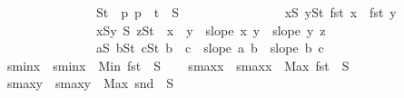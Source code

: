 \begin{isabellebody}
\ \ \ \ \ \ \ \ \ \ \ \ \ \ {\isacharparenleft}{\kern0pt}\ S{}t\ {\isacharequal}{\kern0pt}\ {\isacharparenleft}{\kern0pt}{\isasymlambda}p{\isachardot}{\kern0pt}\ p\ {\isacharplus}{\kern0pt}\ t{\isacharparenright}{\kern0pt}\ {\isacharbackquote}{\kern0pt}\ S{}\ {\isasymand}\isanewline
\ \ \ \ \ \ \ \ \ \ \ \ \ \ \ {\isacharparenleft}{\kern0pt}{\isasymforall}x{\isasymin}S{}{\isachardot}{\kern0pt}\ {\isasymforall}y{\isasymin}S{}t{\isachardot}{\kern0pt}\ fst\ x\ {\isacharless}{\kern0pt}\ fst\ y{\isacharparenright}{\kern0pt}\ {\isasymand}\isanewline
\ \ \ \ \ \ \ \ \ \ \ \ \ \ \ {\isacharparenleft}{\kern0pt}{\isasymforall}x{\isasymin}S{}{\isachardot}{\kern0pt}{\isasymforall}y{\isasymin}\ S{}{\isachardot}{\kern0pt}\ {\isasymforall}z{\isasymin}S{}t{\isachardot}{\kern0pt}\ \ x\ {\isacharless}{\kern0pt}\ y\ {\isasymlongrightarrow}\ slope\ x\ y\ {\isacharless}{\kern0pt}\ slope\ y\ z{\isacharparenright}{\kern0pt}\ {\isasymand}\isanewline
\ \ \ \ \ \ \ \ \ \ \ \ \ \ \ {\isacharparenleft}{\kern0pt}{\isasymforall}a{\isasymin}S{}{\isachardot}{\kern0pt}\ {\isasymforall}b{\isasymin}S{}t{\isachardot}{\kern0pt}\ {\isasymforall}c{\isasymin}S{}t{\isachardot}{\kern0pt}\ b\ {\isacharless}{\kern0pt}\ c\ {\isasymlongrightarrow}\ slope\ a\ b\ {\isachargreater}{\kern0pt}\ slope\ b\ c{\isacharparenright}{\kern0pt}\ {\isacharparenright}{\kern0pt}{\isachardoublequoteclose}\isanewline
%
\isadelimproof
%
\endisadelimproof
%
\isatagproof
{}\isamarkupfalse%
{\isacharminus}{\kern0pt}\isanewline
\ \ \isamarkupfalse%
\ s{}{\isacharunderscore}{\kern0pt}minx\ \ {\isachardoublequoteopen}s{}{\isacharunderscore}{\kern0pt}minx\ {\isacharequal}{\kern0pt}\ Min\ {\isacharparenleft}{\kern0pt}fst\ {\isacharbackquote}{\kern0pt}\ S{}{\isacharparenright}{\kern0pt}{\isachardoublequoteclose}\isanewline
\ \ \isamarkupfalse%
\ s{}{\isacharunderscore}{\kern0pt}maxx\ \ {\isachardoublequoteopen}s{}{\isacharunderscore}{\kern0pt}maxx\ {\isacharequal}{\kern0pt}\ Max\ {\isacharparenleft}{\kern0pt}fst\ {\isacharbackquote}{\kern0pt}\ S{}{\isacharparenright}{\kern0pt}{\isachardoublequoteclose}\isanewline
\ \ \isamarkupfalse%
\ s{}{\isacharunderscore}{\kern0pt}maxy\ \ {\isachardoublequoteopen}s{}{\isacharunderscore}{\kern0pt}maxy\ {\isacharequal}{\kern0pt}\ Max\ {\isacharparenleft}{\kern0pt}snd\ {\isacharbackquote}{\kern0pt}\ S{}{\isacharparenright}{\kern0pt}{\isachardoublequoteclose}\isanewline

\end{isabellebody}
